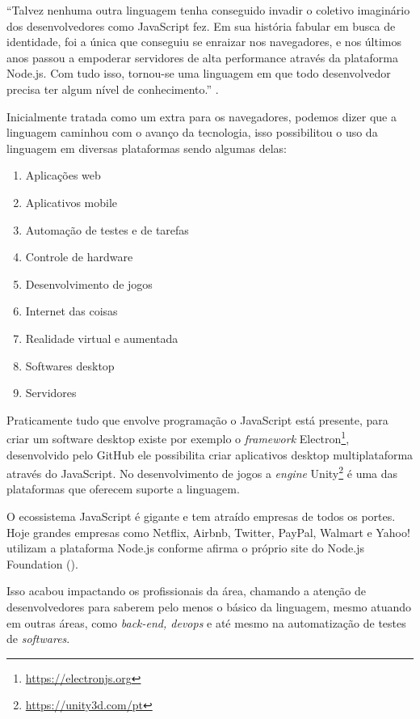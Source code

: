 \documentclass[
	12pt,				%
	openright,			%
	twoside,			%
	a4paper,			%
	english,			%
	brazil				%
	]{abntex2}
\begin{document}
{\begin{adjustwidth}{4cm}{0cm}
“Talvez nenhuma outra linguagem tenha conseguido invadir o coletivo imaginário dos desenvolvedores como JavaScript fez. Em sua história fabular em busca de identidade, foi a única que conseguiu se enraizar nos navegadores, e nos últimos anos passou a empoderar servidores de alta performance através da plataforma Node.js. Com tudo isso, tornou-se uma linguagem em que todo desenvolvedor precisa ter algum nível de conhecimento.” \cite{flavioalmeida_cangaceirojs}.
\end{adjustwidth}}

Inicialmente tratada como um extra para os navegadores, podemos dizer que a linguagem caminhou com o avanço da tecnologia, isso possibilitou o uso da linguagem em diversas plataformas sendo algumas delas:

\begin{enumerate}[label=\alph*)]
\item Aplicações web
\item Aplicativos mobile 
\item Automação de testes e de tarefas
\item Controle de hardware
\item Desenvolvimento de jogos
\item Internet das coisas
\item Realidade virtual e aumentada
\item Softwares desktop
\item Servidores 
\end{enumerate}

Praticamente tudo que envolve programação o JavaScript está presente, para criar um software desktop existe por exemplo o \textit{framework} Electron\footnote{\url{https://electronjs.org}}, desenvolvido pelo GitHub ele possibilita criar aplicativos desktop multiplataforma através do JavaScript. No desenvolvimento de jogos a \textit{engine} Unity\footnote{\url{https://unity3d.com/pt}} é uma das plataformas que oferecem suporte a linguagem.

O ecossistema JavaScript é gigante e tem atraído empresas de todos os portes. Hoje grandes empresas como Netflix, Airbnb, Twitter, PayPal, Walmart e Yahoo! utilizam a plataforma Node.js conforme afirma o próprio site do Node.js Foundation (\citeauthor{node_foundation}).

Isso acabou impactando os profissionais da área, chamando a atenção de desenvolvedores para saberem pelo menos o básico da linguagem, mesmo atuando em outras áreas, como \textit{back-end, devops} e até mesmo na automatização de testes de \textit{softwares}.
\end{document}
